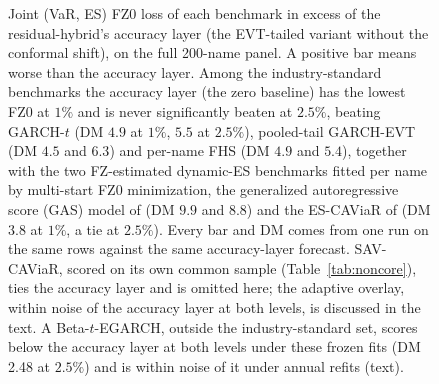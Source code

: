 \documentclass[11pt]{article}
\theoremstyle{remark}
\begin{document}
\begin{figure}[t]
\centering
{}
\caption{Joint (VaR, ES) FZ0 loss of each benchmark in excess of the
residual-hybrid's accuracy layer (the EVT-tailed variant without the
conformal shift), on the full 200-name panel. A positive bar
means worse than the accuracy layer. Among the industry-standard benchmarks the accuracy layer (the zero baseline) has the
lowest FZ0 at $1\%$ and is never significantly beaten at $2.5\%$, beating GARCH-$t$ (DM $4.9$ at
$1\%$, $5.5$ at $2.5\%$), pooled-tail GARCH-EVT (DM $4.5$ and $6.3$) and per-name FHS (DM $4.9$ and $5.4$), together with the two
FZ-estimated dynamic-ES benchmarks fitted per name by multi-start FZ0
minimization, the generalized autoregressive score (GAS) model of \citet{patton2019} (DM $9.9$ and $8.8$) and the
ES-CAViaR of \citet{taylor2019} (DM $3.8$ at $1\%$, a tie at $2.5\%$). Every bar and DM comes from one run on the same rows against the same accuracy-layer forecast. SAV-CAViaR, scored on its own common sample (Table~\ref{tab:noncore}), ties the accuracy layer and is omitted here; the adaptive overlay, within noise of the accuracy layer at both levels, is discussed in the text. A Beta-$t$-EGARCH, outside the industry-standard set, scores below the accuracy layer at both levels under these frozen fits (DM 2.48 at $2.5\%$) and is within noise of it under annual refits (text).}
\label{fig:fz0}
\end{figure}
\end{document}
